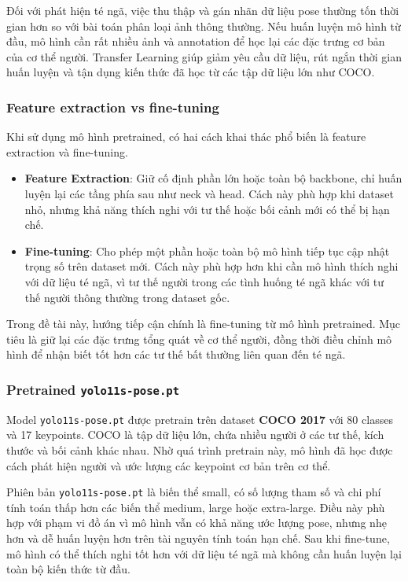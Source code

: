 \documentclass[12pt, a4paper]{article}
\begin{document}
Đối với phát hiện té ngã, việc thu thập và gán nhãn dữ liệu pose thường tốn thời gian hơn so với bài toán phân loại ảnh thông thường.
Nếu huấn luyện mô hình từ đầu, mô hình cần rất nhiều ảnh và annotation để học lại các đặc trưng cơ bản của cơ thể người.
Transfer Learning giúp giảm yêu cầu dữ liệu, rút ngắn thời gian huấn luyện và tận dụng kiến thức đã học từ các tập dữ liệu lớn như COCO.

\subsubsection{Feature extraction vs fine-tuning}
Khi sử dụng mô hình pretrained, có hai cách khai thác phổ biến là feature extraction và fine-tuning.

\begin{itemize}
  \item \textbf{Feature Extraction}: Giữ cố định phần lớn hoặc toàn bộ backbone, chỉ huấn luyện lại các tầng phía sau như neck và head. Cách này phù hợp khi dataset nhỏ, nhưng khả năng thích nghi với tư thế hoặc bối cảnh mới có thể bị hạn chế.
  \item \textbf{Fine-tuning}: Cho phép một phần hoặc toàn bộ mô hình tiếp tục cập nhật trọng số trên dataset mới. Cách này phù hợp hơn khi cần mô hình thích nghi với dữ liệu té ngã, vì tư thế người trong các tình huống té ngã khác với tư thế người thông thường trong dataset gốc.
\end{itemize}

Trong đề tài này, hướng tiếp cận chính là fine-tuning từ mô hình pretrained.
Mục tiêu là giữ lại các đặc trưng tổng quát về cơ thể người, đồng thời điều chỉnh mô hình để nhận biết tốt hơn các tư thế bất thường liên quan đến té ngã.

\subsubsection{Pretrained \texttt{yolo11s-pose.pt}}
Model \texttt{yolo11s-pose.pt} được pretrain trên dataset \textbf{COCO 2017} với 80 classes và 17 keypoints.
COCO là tập dữ liệu lớn, chứa nhiều người ở các tư thế, kích thước và bối cảnh khác nhau.
Nhờ quá trình pretrain này, mô hình đã học được cách phát hiện người và ước lượng các keypoint cơ bản trên cơ thể.

Phiên bản \texttt{yolo11s-pose.pt} là biến thể small, có số lượng tham số và chi phí tính toán thấp hơn các biến thể medium, large hoặc extra-large.
Điều này phù hợp với phạm vi đồ án vì mô hình vẫn có khả năng ước lượng pose, nhưng nhẹ hơn và dễ huấn luyện hơn trên tài nguyên tính toán hạn chế.
Sau khi fine-tune, mô hình có thể thích nghi tốt hơn với dữ liệu té ngã mà không cần huấn luyện lại toàn bộ kiến thức từ đầu.
\end{document}
